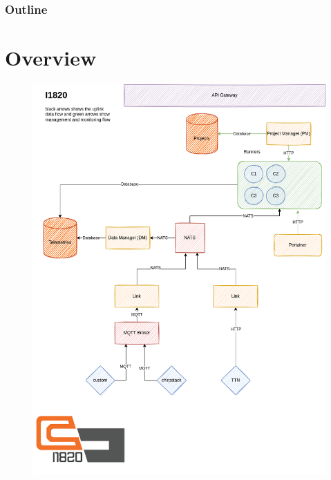 \documentclass{../iot-lecture}
\subtitle{I1820 Platforms}
\begin{document}
\begin{frame}
  \titlepage{}
\end{frame}
\begin{frame}
  \frametitle{Outline}
  \tableofcontents{}
\end{frame}

\section{Overview}

\begin{frame}
  \begin{figure}
    \includegraphics[height=\textheight]{./img/arch.png}
  \end{figure}
\end{frame}
\end{document}
